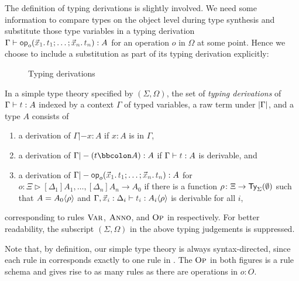 The definition of typing derivations is slightly involved.
We need some information to compare types on the object level during type synthesis and substitute those type variables in a typing derivation $\Gamma \vdash \tmOpts : A$ for an operation $o$ in $\Omega$ at some point.
Hence we choose to include a substitution as part of its typing derivation explicitly:
\begin{definition}\label{def:typing-derivations}
  \begin{figure}
    \centering
    \small
    \caption{Typing derivations}
    \label{fig:extrinsic-typing}
  \end{figure}
  In a simple type theory specified by $(\Sigma, \Omega)$, the set of \emph{typing derivations} of $\Gamma \vdash \isTerm{t} : A$ indexed by a context $\Gamma$ of typed variables, a raw term under $\left|\Gamma\right|$, and a type $A$ consists of 
  \begin{enumerate}
    \item a derivation of $\Gamma |- x : A$ if $x : A$ is in $\Gamma$,
    \item a derivation of $\Gamma |- (t \annotate A) : A$ if $\Gamma \vdash \isTerm{t} : A$ is derivable, and
    \item a derivation of $\Gamma |- \tmOpts : A$ for $o \colon \Xi \rhd [\Delta_1]A_1, \ldots, [\Delta_{n}]A_{n} \to A_0$ if there is a function $\rho\colon \Xi \to \mathsf{Ty}_{\Sigma}(\emptyset)$ such that $A = {A_0}\!\left<{\rho}\right>$ and $\Gamma, \vars{x}_{\isTerm{i}} : \Delta_i \vdash \isTerm{t_i} : \simsub{A_i}{\rho}$ is derivable for all $i$,
  \end{enumerate}
  corresponding to rules $\textnormal{\textsc{Var}}$, $\textnormal{\textsc{Anno}}$, and $\textnormal{\textsc{Op}}$ in  respectively.
  For better readability, the subscript $(\Sigma, \Omega)$ in the above typing judgements is suppressed.
\end{definition}
Note that, by definition, our simple type theory is always syntax-directed, since each rule in  corresponds exactly to one rule in . 
The $\textnormal{\textsc{Op}}$ in both figures is a rule schema and gives rise to as many rules as there are operations in $o : O$.

